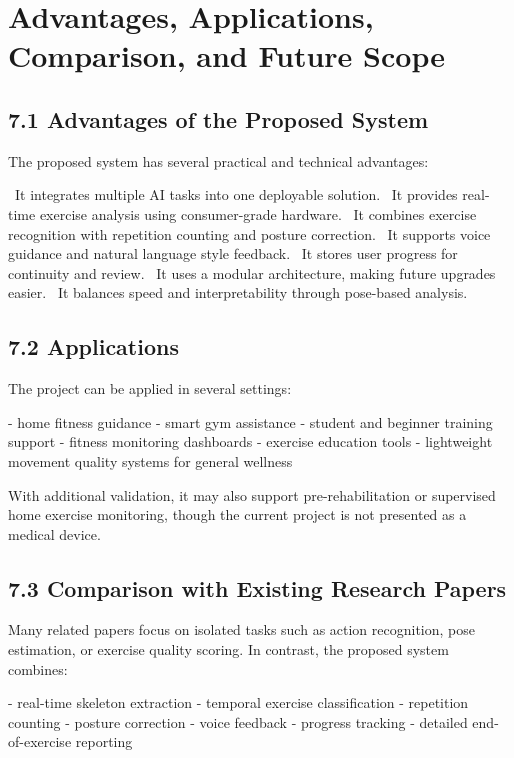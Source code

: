 \documentclass[12pt,a4paper]{report}
\begin{document}
\chapter{Advantages, Applications, Comparison, and Future Scope}

\section{7.1 Advantages of the Proposed System}
The proposed system has several practical and technical advantages:

\noindent\textbullet\ It integrates multiple AI tasks into one deployable solution.  
\noindent\textbullet\ It provides real-time exercise analysis using consumer-grade hardware.  
\noindent\textbullet\ It combines exercise recognition with repetition counting and posture correction.  
\noindent\textbullet\ It supports voice guidance and natural language style feedback.  
\noindent\textbullet\ It stores user progress for continuity and review.  
\noindent\textbullet\ It uses a modular architecture, making future upgrades easier.  
\noindent\textbullet\ It balances speed and interpretability through pose-based analysis.

\section{7.2 Applications}
The project can be applied in several settings:

- home fitness guidance  
- smart gym assistance  
- student and beginner training support  
- fitness monitoring dashboards  
- exercise education tools  
- lightweight movement quality systems for general wellness

With additional validation, it may also support pre-rehabilitation or supervised home exercise monitoring, though the current project is not presented as a medical device.

\section{7.3 Comparison with Existing Research Papers}
Many related papers focus on isolated tasks such as action recognition, pose estimation, or exercise quality scoring. In contrast, the proposed system combines:

- real-time skeleton extraction  
- temporal exercise classification  
- repetition counting  
- posture correction  
- voice feedback  
- progress tracking  
- detailed end-of-exercise reporting
\end{document}
